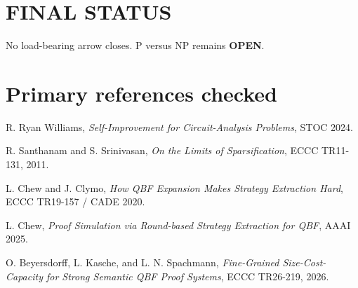 \documentclass[11pt]{article}
\begin{document}
\section*{FINAL STATUS}
No load-bearing arrow closes. P versus NP remains \textbf{OPEN}.

\section*{Primary references checked}
R. Ryan Williams, \emph{Self-Improvement for Circuit-Analysis Problems}, STOC 2024.

R. Santhanam and S. Srinivasan, \emph{On the Limits of Sparsification}, ECCC TR11-131, 2011.

L. Chew and J. Clymo, \emph{How QBF Expansion Makes Strategy Extraction Hard}, ECCC TR19-157 / CADE 2020.

L. Chew, \emph{Proof Simulation via Round-based Strategy Extraction for QBF}, AAAI 2025.

O. Beyersdorff, L. Kasche, and L. N. Spachmann, \emph{Fine-Grained Size-Cost-Capacity for Strong Semantic QBF Proof Systems}, ECCC TR26-219, 2026.

\end{document}
